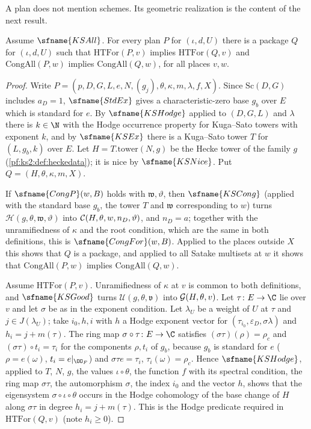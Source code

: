 A plan does not mention schemes. Its geometric realization is the content of the next result.

\begin{proposition}\label{pf:geo:planpack}
Assume $\sfname{KSAll}$. For every plan $P$ for $(\iota,d,U)$ there is a package $Q$ for $(\iota,d,U)$
such that $\mathrm{HTFor}(P,v)$ implies $\mathrm{HTFor}(Q,v)$ and $\mathrm{CongAll}(P,w)$ implies
$\mathrm{CongAll}(Q,w)$, for all places $v,w$.
\end{proposition}

\begin{proof}
Write $P=(p,D,G,L,e,N,(g_j),\theta,\kappa,m,\lambda,f,X)$. Since $\mathrm{Sc}(D,G)$ includes $a_D=1$,
$\sfname{StdEx}$ gives a characteristic-zero base $g_b$ over $E$ which is standard for $e$. By
$\sfname{KSHodge}$ applied to $(D,G,L)$ and $\lambda$ there is $k\in\N$ with the Hodge occurrence property
for Kuga--Sato towers with exponent $k$, and by $\sfname{KSEx}$ there is a Kuga--Sato tower $T$ for
$(L,g_b,k)$ over $E$. Let $H=T.\mathrm{tower}(N,g)$ be the Hecke tower of the family $g$
(\cref{pf:ks2:def:heckedata}); it is nice by $\sfname{KSNice}$. Put $Q=(H,\theta,\kappa,m,X)$.

If $\sfname{CongP}(w,B)$ holds with $\mathfrak w,\vartheta$, then $\sfname{KSCong}$ (applied with the
standard base $g_b$, the tower $T$ and $\mathfrak w$ corresponding to $w$) turns
$\mathcal H(g,\theta,\mathfrak w,\vartheta)$ into $\mathcal{C}(H,\theta,w,n_D,\vartheta)$, and $n_D=a$; together with
the unramifiedness of $\kappa$ and the root condition, which are the same in both definitions, this is
$\sfname{CongFor}(w,B)$. Applied to the places outside $X$ this shows that $Q$ is a package, and applied
to all Satake multisets at $w$ it shows that $\mathrm{CongAll}(P,w)$ implies $\mathrm{CongAll}(Q,w)$.

Assume $\mathrm{HTFor}(P,v)$. Unramifiedness of $\kappa$ at $v$ is common to both definitions, and
$\sfname{KSGood}$ turns $\mathcal U(g,\theta,\mathfrak v)$ into $\mathcal{G}(H,\theta,v)$. Let $\tau\colon E\to\C$ lie over
$v$ and let $\sigma$ be as in the exponent condition. Let $\lambda_U$ be a weight of $U$ at $\tau$ and
$j\in J(\lambda_U)$; take $i_0,h,i$ with $h$ a Hodge exponent vector for $(\tau_{i_0},\varepsilon_D,\sigma\lambda)$ and
$h_i=j+m(\tau)$. The ring map $\sigma\circ\tau\colon E\to\C$ satisfies $(\sigma\tau)(\rho)=\rho_c$ and
$(\sigma\tau)\circ t_i=\tau_i$ for the components $\rho,t_i$ of $g_b$, because $g_b$ is standard for $e$
($\rho=e(\omega)$, $t_i=e|_{\OO_{F}}$) and $\sigma\tau e=\tau_i$, $\tau_i(\omega)=\rho_c$. Hence $\sfname{KSHodge}$, applied to
$T$, $N$, $g$, the values $\iota\circ\theta$, the function $f$ with its spectral condition, the ring map
$\sigma\tau$, the automorphism $\sigma$, the index $i_0$ and the vector $h$, shows that the eigensystem
$\sigma\circ\iota\circ\theta$ occurs in the Hodge cohomology of the base change of $H$ along $\sigma\tau$ in
degree $h_i=j+m(\tau)$. This is the Hodge predicate required in $\mathrm{HTFor}(Q,v)$ (note $h_i\ge0$).
\end{proof}

